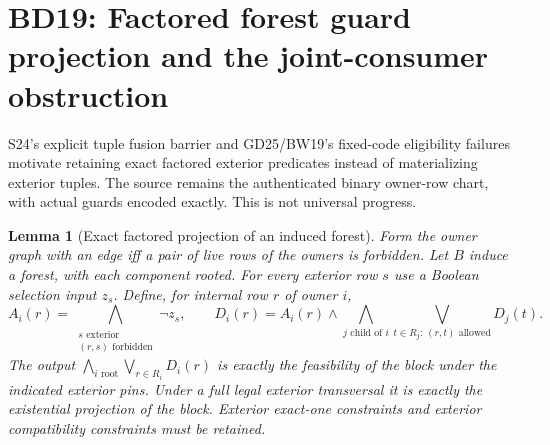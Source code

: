 \documentclass[11pt]{article}
\newtheorem{lemma}[theorem]{Lemma}
\begin{document}
\section{BD19: Factored forest guard projection and the joint-consumer obstruction}\label{sec:bd19}
S24's explicit tuple fusion barrier and GD25/BW19's fixed-code eligibility failures motivate retaining exact factored exterior predicates instead of materializing exterior tuples. The source remains the authenticated binary owner-row chart, with actual guards encoded exactly. This is not universal progress.

\begin{lemma}[Exact factored projection of an induced forest]\label{lem:bd19-forest}
Form the owner graph with an edge iff a pair of live rows of the owners is forbidden. Let $B$ induce a forest, with each component rooted. For every exterior row $s$ use a Boolean selection input $z_s$. Define, for internal row $r$ of owner $i$,
\[
 A_i(r)=\bigwedge_{\substack{s\text{ exterior}\\(r,s)\text{ forbidden}}}\neg z_s,\qquad
 D_i(r)=A_i(r)\land\bigwedge_{j\text{ child of }i}
       \bigvee_{t\in R_j:\,(r,t)\text{ allowed}}D_j(t).
\]
The output $\bigwedge_{i\text{ root}}\bigvee_{r\in R_i}D_i(r)$ is exactly the feasibility of the block under the indicated exterior pins. Under a full legal exterior transversal it is exactly the existential projection of the block. Exterior exact-one constraints and exterior compatibility constraints must be retained.
\end{lemma}
\end{document}
